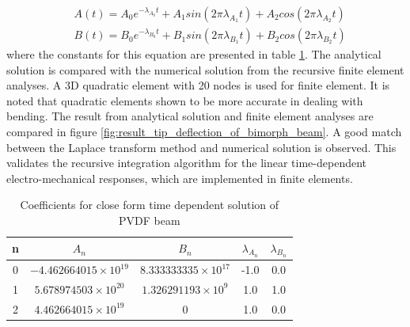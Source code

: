 \begin{equation}
\begin{aligned}
&A(t)=A_0 e^{-\lambda_{A_0} t}+A_1 sin(2\pi \lambda_{A_1} t)+A_2 cos(2\pi
\lambda_{A_2} t)
\\
&B(t)=B_0 e^{-\lambda_{B_0} t}+B_1 sin(2\pi \lambda_{B_1} t)+B_2 cos(2\pi
\lambda_{B_2} t)
\end{aligned}
\label{EQN:PVDF_beam_closed_form_solution_functions}
\end{equation}
where the constants for this equation are presented in table \ref{table:PVDF_bimorph_time_dependent_solution_coefficients}.
The analytical solution is compared with the numerical solution from the recursive finite element analyses.
A 3D quadratic element with 20 nodes is used for finite element.
It is noted that quadratic elements shown to be more accurate in dealing with bending.
The result from analytical solution and finite element analyses are compared in figure \ref{fig:result_tip_deflection_of_bimorph_beam}.
A good match between the Laplace transform method and numerical solution is observed.
This validates the recursive integration algorithm for the linear time-dependent electro-mechanical responses, which are implemented in finite elements.

\begin{table}
\caption{Coefficients for close form time dependent solution of PVDF beam}
\centering
\begin{tabular}{ccccc} \hline
n & $A_n$ & $B_n$ & $\lambda_{A_n}$& $\lambda_{B_n}$\\ \hline
0 & $-4.462664015\times 10^{19}$ & $8.333333335\times 10^{17}$ & -1.0 & 0.0\\ 
1 & $5.678974503\times 10^{20}$ & $1.326291193\times 10^9$ & 1.0 & 1.0\\ 
2 & $4.462664015\times 10^{19}$ & $0$ & 1.0 & 0.0 \\ \hline
\end{tabular}
\label{table:PVDF_bimorph_time_dependent_solution_coefficients}
\end{table}

